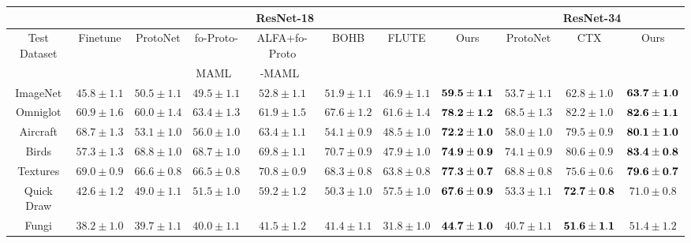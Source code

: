 \begin{table*}[ht]
	\centering
    \resizebox{0.9\textwidth}{!}
    {
		\begin{tabular}{cccccccc|ccc}

		   	& \multicolumn{7}{c}{ResNet-18} & \multicolumn{3}{c}{ResNet-34} \\
		   	\toprule
		    \multirow{2}{*}{Test Dataset} & Finetune & ProtoNet & fo-Proto- & ALFA+fo-Proto & BOHB & FLUTE & \multirow{2}{*}{Ours} & ProtoNet & CTX & \multirow{2}{*}{Ours}\\
		    & \cite{triantafillou2019meta} & \cite{triantafillou2019meta} & MAML~\cite{triantafillou2019meta} & -MAML~\cite{triantafillou2019meta} & \cite{saikia2020optimized} & \cite{triantafillou2021flute} &  & \cite{doersch2020crosstransformers} & \cite{doersch2020crosstransformers} & \\
		    \midrule
			ImageNet & $45.8 \pm 1.1$ & $50.5 \pm 1.1$ & $49.5 \pm 1.1$ & $52.8 \pm 1.1$ & $51.9 \pm 1.1$ & $46.9 \pm 1.1$ & ${\bf 59.5 \pm 1.1}$ & $53.7 \pm 1.1$ & $62.8 \pm 1.0$ & ${\bf 63.7 \pm 1.0}$ \\
			\midrule
			Omniglot & $60.9 \pm 1.6$ & $60.0 \pm 1.4$ & $63.4 \pm 1.3$ & $61.9 \pm 1.5$ & $67.6 \pm 1.2$ & $61.6 \pm 1.4$ & ${\bf 78.2 \pm 1.2}$ & $68.5 \pm 1.3$ & $82.2 \pm 1.0$ & ${\bf 82.6 \pm 1.1}$ \\
			Aircraft & $68.7 \pm 1.3$ & $53.1 \pm 1.0$ & $56.0 \pm 1.0$ & $63.4 \pm 1.1$ & $54.1 \pm 0.9$ & $48.5 \pm 1.0$ & ${\bf 72.2 \pm 1.0}$ & $58.0 \pm 1.0$ & $79.5 \pm 0.9$ & ${\bf 80.1 \pm 1.0}$ \\
			Birds & $57.3 \pm 1.3$ & $68.8 \pm 1.0$ & $68.7 \pm 1.0$ & $69.8 \pm 1.1$ & $70.7 \pm 0.9$ & $47.9 \pm 1.0$ & ${\bf 74.9 \pm 0.9}$ & $74.1 \pm 0.9$ & $80.6 \pm 0.9$ & ${\bf 83.4 \pm 0.8}$ \\
			Textures & $69.0 \pm 0.9$ & $66.6 \pm 0.8$ & $66.5 \pm 0.8$ & $70.8 \pm 0.9$ & $68.3 \pm 0.8$ & $63.8 \pm 0.8$ & ${\bf 77.3 \pm 0.7}$ & $68.8 \pm 0.8$ & $75.6 \pm 0.6$ & ${\bf 79.6 \pm 0.7}$ \\
			Quick Draw & $42.6 \pm 1.2$ & $49.0 \pm 1.1$ & $51.5 \pm 1.0$ & $59.2 \pm 1.2$ & $50.3 \pm 1.0$ & $57.5 \pm 1.0$ & ${\bf 67.6 \pm 0.9}$ & $53.3 \pm 1.1$ & ${\bf 72.7 \pm 0.8}$ & $71.0 \pm 0.8$ \\
			Fungi & $38.2 \pm 1.0$ & $39.7 \pm 1.1$ & $40.0 \pm 1.1$ & $41.5 \pm 1.2$ & $41.4 \pm 1.1$ & $31.8 \pm 1.0$ & ${\bf 44.7 \pm 1.0}$ & $40.7 \pm 1.1$ & ${\bf 51.6 \pm 1.1}$ & $51.4 \pm 1.2$ \\

\end{tabular}}
\end{table*}
